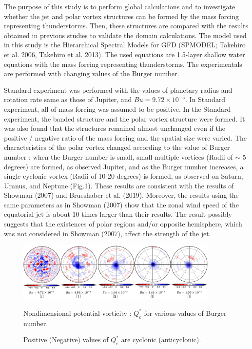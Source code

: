 \documentclass[a4j,8pt]{jarticle}
\begin{document}
The purpose of this study is to perform global calculations and 
to investigate whether the jet and polar vortex structures
can be formed by the mass forcing representing thunderstorms.
Then, these structures are compared with the results obtained 
in previous studies to validate the domain calculations.
The model used in this study is the Hierarchical 
Spectral Models for GFD (SPMODEL; Takehiro et al. 2006, Takehiro et al. 2013).
The used equations are 1.5-layer shallow water equations 
with the mass forcing representing thunderstorms.
The experimentals are performed with changing values of the Burger number.

Standard experiment was performed with the values of 
planetary radius and rotation rate same as those of Jupiter, and $Bu = 9.72 \times 10^{-5}$.
In Standard experiment, all of mass forcing was assumed to be positive.
In the Standard experiment, the banded structure and the polar vortex structure were formed.
It was also found that the structures remained almost unchanged 
even if the positive / negative ratio of the mass forcing and the spatial size were varied.
The characteristics of the polar vortex changed according to the value of Burger number :
when the Burger number is small, small multiple vortices (Radii of $\sim$ 5 degrees) are formed, as observed Jupiter,
and as the Burger number increases, a single cyclonic vortex (Radii of 10-20 degrees) is formed, 
as observed on Saturn, Uranus, and Neptune (Fig.1).
These results are consistent with the results of Showman (2007) and Brueshaber et al. (2019).
Moreover, the results using the same parameters as in Showman (2007) show 
that the zonal wind speed of the equatorial jet is about 10 times larger than their results.
The result possibly suggests that the existences of polar regions and/or opposite hemisphere,
which was not considered in Showman (2007), affect the strength of the jet.
%
\begin{figure}[b]
  \begin{center}
  \includegraphics[width=10cm]{./fig/case1_nonqv_a.png}
  \caption{ \footnotesize Nondimensional potential vorticity : $Q_e^*$ for various values of Burger number.}
\captionsetup{labelformat=empty,labelsep=none}
\caption{\footnotesize Positive (Negative) values of $Q_e^*$ are cyclonic (anticyclonic).}
  \label{case1:nonqv_a}
  \end{center}
\end{figure}
%
%
\end{document}
